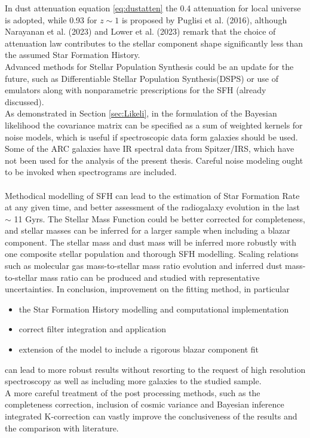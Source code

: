 In dust attenuation equation \ref{eq:dustatten} the 0.4 attenuation for local universe is adopted, while 0.93 for $z \sim 1$ is proposed by Puglisi et al. (2016)\cite{Pugli2016}, although Narayanan et al. (2023)\cite{Narayanan2023} and Lower et al. (2023)\cite{Lower2023} remark that the choice of attenuation law contributes to the stellar component shape significantly less than the assumed Star Formation History.\\
Advanced methods for Stellar Population Synthesis could be an update for the future, such as  Differentiable Stellar Population Synthesis(DSPS)\cite{Hearin2023} or use of emulators\cite{Kwon2023} along with nonparametric prescriptions for the SFH (already discussed).\\
As demonstrated in Section \ref{sec:Likeli}, in the formulation of the Bayesian likelihood the covariance matrix can be specified as a sum of weighted kernels for noise models, which is useful if spectroscopic data form galaxies should be used. Some of the ARC galaxies have IR spectral data from Spitzer/IRS, which have not been used for the analysis of the present thesis. Careful noise modeling ought to be invoked when spectrograms are included.\\ \\
Methodical modelling of SFH can lead to the estimation of Star Formation Rate at any given time, and better assessment of the radiogalaxy evolution in the last $\sim$ 11 Gyrs. 
The Stellar Mass Function could be better corrected for completeness, and stellar masses can be inferred for a larger sample when including a blazar component. The stellar mass and dust mass will be inferred more robustly with one composite stellar population and thorough SFH modelling. 
Scaling relations such as molecular gas mass-to-stellar mass ratio evolution and inferred dust mass-to-stellar mass ratio can be produced and studied with representative uncertainties. 
In conclusion, improvement on the fitting method, in particular
\begin{itemize}
    \item the Star Formation History modelling and computational implementation
    \item correct filter integration and application
    \item extension of the model to include a rigorous blazar component fit
\end{itemize}
can lead to more robust results without resorting to the request of high resolution spectroscopy as well as including more galaxies to the studied sample.\\
A more careful treatment of the post processing methods, such as the completeness correction, inclusion of cosmic variance and Bayesian inference integrated K-correction can vastly improve the conclusiveness of the results and the comparison with literature.


